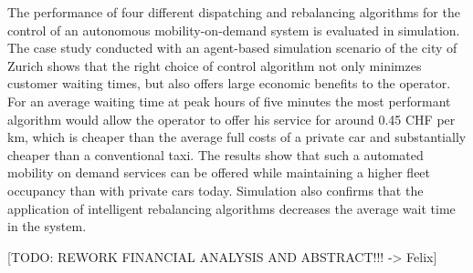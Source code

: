 The performance of four different dispatching and rebalancing algorithms for the
control of an autonomous mobility-on-demand system is evaluated in simulation.
The case study conducted with an agent-based simulation scenario of the city of Zurich
shows that the right choice of control algorithm not only minimzes customer waiting
times, but also offers large economic benefits to the operator. For an average
waiting time at peak hours of five minutes the most performant algorithm would allow
the operator to offer his service for around 0.45 CHF per km, which is cheaper than
the average full costs of a private car and substantially cheaper than a conventional
taxi. The results show that such a automated mobility on demand services can be offered
while maintaining a higher fleet occupancy than with private cars today. Simulation
also confirms that the application of intelligent rebalancing algorithms decreases
the average wait time in the system.

[TODO: REWORK FINANCIAL ANALYSIS AND ABSTRACT!!! -> Felix]
